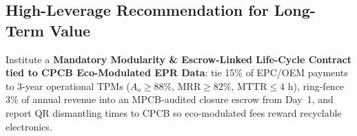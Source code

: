 \subsection{High-Leverage Recommendation for Long-Term Value}
Institute a \textbf{Mandatory Modularity \& Escrow-Linked Life-Cycle Contract tied to CPCB Eco-Modulated EPR Data}: tie 15\% of EPC/OEM payments to 3-year operational TPMs ($A_o \ge 88\%$, $\text{MRR} \ge 82\%$, $\text{MTTR} \le 4\text{ h}$), ring-fence 3\% of annual revenue into an MPCB-audited closure escrow from Day~1, and report QR dismantling times to CPCB so eco-modulated fees reward recyclable electronics.
